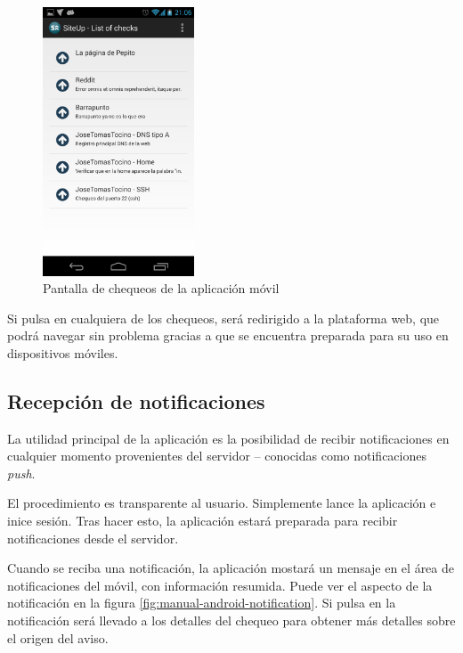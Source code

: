 \begin{figure}[hbtp]
  \centering
  \includegraphics[width=0.4\textwidth]{5_diseno/android-4}
  \caption{Pantalla de chequeos de la aplicación móvil}
  \label{fig:manual-android-dashboard}
\end{figure}

Si pulsa en cualquiera de los chequeos, será redirigido a la plataforma web, que
podrá navegar sin problema gracias a que se encuentra preparada para su uso en
dispositivos móviles.

\subsection{Recepción de notificaciones}

La utilidad principal de la aplicación es la posibilidad de recibir
notificaciones en cualquier momento provenientes del servidor -- conocidas como
notificaciones \textit{push}. 

El procedimiento es transparente al usuario. Simplemente lance la aplicación e
inice sesión. Tras hacer esto, la aplicación estará preparada para recibir
notificaciones desde el servidor.

Cuando se reciba una notificación, la aplicación mostará un mensaje en el área
de notificaciones del móvil, con información resumida. Puede ver el aspecto de
la notificación en la figura \ref{fig:manual-android-notification}. Si pulsa en
la notificación será llevado a los detalles del chequeo para obtener más
detalles sobre el origen del aviso.

